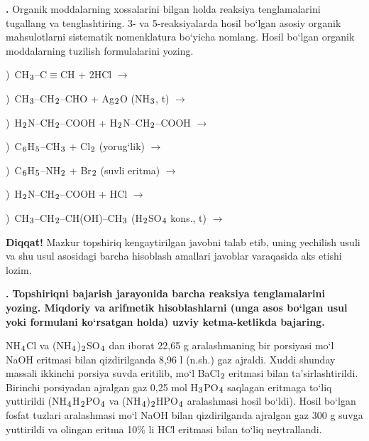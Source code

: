 \documentclass[11pt,a4paper]{article}
\renewcommand{\textsubscript}[1]{\ensuremath{_{\text{\fontsize{8}{8}\selectfont #1}}}}
\newcommand{\qn}[1]{\textbf{\fontsize{11.5}{13}\selectfont #1}}
\newcommand{\qsep}{\par\vspace{13pt}}
\newcommand{\diqqat}[1]{\par\smallskip\noindent\textbf{Diqqat!} #1\par\medskip}
\begin{document}
\noindent\qn{42.} Organik moddalarning xossalarini bilgan holda reaksiya tenglamalarini tugallang va tenglashtiring. 3- va 5-reaksiyalarda hosil bo`lgan asosiy organik mahsulotlarni sistematik nomenklatura bo`yicha nomlang. Hosil bo`lgan organik moddalarning tuzilish formulalarini yozing.\par
{})\ CH\textsubscript{3}--C$\equiv$CH + 2HCl $\to$\par
{})\ CH\textsubscript{3}--CH\textsubscript{2}--CHO + Ag\textsubscript{2}O (NH\textsubscript{3}, t) $\to$\par
{})\ H\textsubscript{2}N--CH\textsubscript{2}--COOH + H\textsubscript{2}N--CH\textsubscript{2}--COOH $\to$\par
{})\ C\textsubscript{6}H\textsubscript{5}--CH\textsubscript{3} + Cl\textsubscript{2} (yorug`lik) $\to$\par
{})\ C\textsubscript{6}H\textsubscript{5}--NH\textsubscript{2} + Br\textsubscript{2} (suvli eritma) $\to$\par
{})\ H\textsubscript{2}N--CH\textsubscript{2}--COOH + HCl $\to$\par
{})\ CH\textsubscript{3}--CH\textsubscript{2}--CH(OH)--CH\textsubscript{3} (H\textsubscript{2}SO\textsubscript{4} kons., t) $\to$\par
\diqqat{Mazkur topshiriq kengaytirilgan javobni talab etib, uning yechilish usuli va shu usul asosidagi barcha hisoblash amallari javoblar varaqasida aks etishi lozim.}\qsep
\noindent\qn{43.} \textbf{Topshiriqni bajarish jarayonida barcha reaksiya tenglamalarini yozing. Miqdoriy va arifmetik hisoblashlarni (unga asos bo`lgan usul yoki formulani ko`rsatgan holda) uzviy ketma-ketlikda bajaring.}\par\smallskip
NH\textsubscript{4}Cl va (NH\textsubscript{4})\textsubscript{2}SO\textsubscript{4} dan iborat 22,65 g aralashmaning bir porsiyasi mo`l NaOH eritmasi bilan qizdirilganda 8,96 l (n.sh.) gaz ajraldi. Xuddi shunday massali ikkinchi porsiya suvda eritilib, mo`l BaCl\textsubscript{2} eritmasi bilan ta'sirlashtirildi. Birinchi porsiyadan ajralgan gaz 0,25 mol H\textsubscript{3}PO\textsubscript{4} saqlagan eritmaga to`liq yuttirildi (NH\textsubscript{4}H\textsubscript{2}PO\textsubscript{4} va (NH\textsubscript{4})\textsubscript{2}HPO\textsubscript{4} aralashmasi hosil bo`ldi). Hosil bo`lgan fosfat tuzlari aralashmasi mo`l NaOH bilan qizdirilganda ajralgan gaz 300 g suvga yuttirildi va olingan eritma 10\% li HCl eritmasi bilan to`liq neytrallandi.\par
\end{document}
